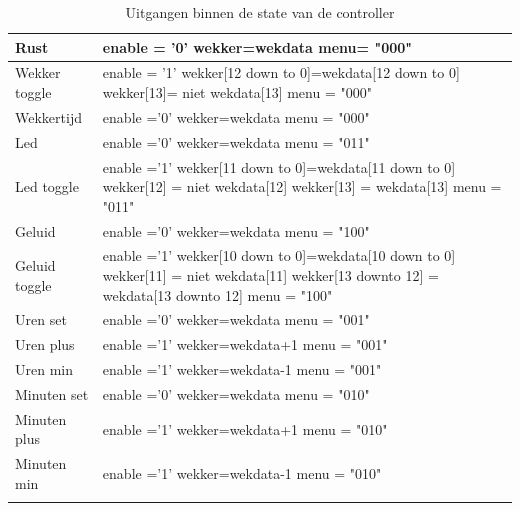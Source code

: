 \begin{longtable}{|p{}| p{}|}
\hline
Rust &
enable = '0' \newline
wekker=wekdata \newline
menu= "000" \\ \hline
Wekker toggle &
enable = '1' \newline
wekker[12 down to 0]=wekdata[12 down to 0] \newline
wekker[13]= niet wekdata[13] \newline
menu = "000" \\ \hline
Wekkertijd &
enable ='0' \newline
wekker=wekdata \newline
menu = "000" \\ \hline
Led &
enable ='0' \newline
wekker=wekdata \newline
menu = "011" \\ \hline
Led toggle &
enable ='1' \newline
wekker[11 down to 0]=wekdata[11 down to 0]\newline
wekker[12] = niet wekdata[12] \newline
wekker[13] = wekdata[13] \newline
menu = "011" \\ \hline
Geluid & 
enable ='0' \newline
wekker=wekdata \newline
menu = "100" \\ \hline
Geluid toggle &
enable ='1' \newline
wekker[10 down to 0]=wekdata[10 down to 0] \newline
wekker[11] = niet wekdata[11] \newline
wekker[13 downto 12] = wekdata[13 downto 12] \newline
menu = "100" \\ \hline
Uren set &
enable ='0' \newline
wekker=wekdata \newline
menu = "001" \\ \hline
Uren plus &
enable ='1' \newline
wekker=wekdata+1 \newline
menu = "001" \\ \hline
Uren min &
enable ='1' \newline
wekker=wekdata-1 \newline
menu = "001" \\ \hline
Minuten set&
enable ='0' \newline
wekker=wekdata \newline
menu = "010" \\ \hline
Minuten plus &
enable ='1' \newline
wekker=wekdata+1 \newline
menu = "010" \\ \hline
Minuten min &
enable ='1' \newline
wekker=wekdata-1 \newline
menu = "010" \\ \hline
\caption{Uitgangen binnen de state van de controller} 
\label{tab:states_controller}
\end{longtable}

